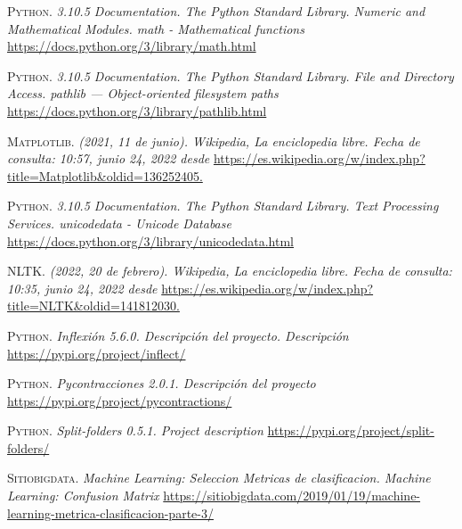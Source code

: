 \documentclass[conference,a4paper]{IEEEtran}
\begin{document}
\begin{thebibliography}{30}
 \textsc{Python.} \textit{3.10.5 Documentation. The Python Standard Library. Numeric and Mathematical Modules. math - Mathematical functions} \url{https://docs.python.org/3/library/math.html}

 \textsc{Python.} \textit{3.10.5 Documentation. The Python Standard Library. File and Directory Access. pathlib — Object-oriented filesystem paths} \url{https://docs.python.org/3/library/pathlib.html}

 \textsc{Matplotlib.} \textit{(2021, 11 de junio). Wikipedia, La enciclopedia libre. Fecha de consulta: 10:57, junio 24, 2022 desde} \url{https://es.wikipedia.org/w/index.php?title=Matplotlib&oldid=136252405.}


 \textsc{Python.} \textit{ 3.10.5 Documentation. The Python Standard Library. Text Processing Services. unicodedata - Unicode Database} \url{https://docs.python.org/3/library/unicodedata.html}

 \textsc{NLTK.} \textit{ (2022, 20 de febrero). Wikipedia, La enciclopedia libre. Fecha de consulta: 10:35, junio 24, 2022 desde} \url{https://es.wikipedia.org/w/index.php?title=NLTK&oldid=141812030.}

 \textsc{Python.} \textit{Inflexión 5.6.0. Descripción del proyecto. Descripción} \url{https://pypi.org/project/inflect/}

 \textsc{Python.} \textit{Pycontracciones 2.0.1. Descripción del proyecto} \url{https://pypi.org/project/pycontractions/}

 \textsc{Python.} \textit{Split-folders 0.5.1. Project description} \url{https://pypi.org/project/split-folders/}

 \textsc{Sitiobigdata.} \textit{Machine Learning: Seleccion Metricas de clasificacion. Machine Learning: Confusion Matrix} \url{https://sitiobigdata.com/2019/01/19/machine-learning-metrica-clasificacion-parte-3/}




\end{thebibliography}
\end{document}
